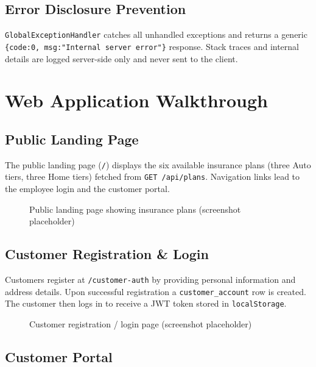 \documentclass[12pt,letterpaper]{article}
\begin{document}
\subsection{Error Disclosure Prevention}

\texttt{GlobalExceptionHandler} catches all unhandled exceptions and returns a generic \texttt{\{code:0, msg:"Internal server error"\}} response. Stack traces and internal details are logged server-side only and never sent to the client.

\section{Web Application Walkthrough}

\subsection{Public Landing Page}

The public landing page (\texttt{/}) displays the six available insurance plans (three Auto tiers, three Home tiers) fetched from \texttt{GET /api/plans}. Navigation links lead to the employee login and the customer portal.

\begin{figure}[H]
  \centering
  \fbox{\rule{0pt}{5cm}\rule{0.8\linewidth}{0pt}}
  \caption{Public landing page showing insurance plans (screenshot placeholder)}
\end{figure}

\subsection{Customer Registration \& Login}

Customers register at \texttt{/customer-auth} by providing personal information and address details. Upon successful registration a \texttt{customer\_account} row is created. The customer then logs in to receive a JWT token stored in \texttt{localStorage}.

\begin{figure}[H]
  \centering
  \fbox{\rule{0pt}{5cm}\rule{0.8\linewidth}{0pt}}
  \caption{Customer registration / login page (screenshot placeholder)}
\end{figure}

\subsection{Customer Portal}
\end{document}

